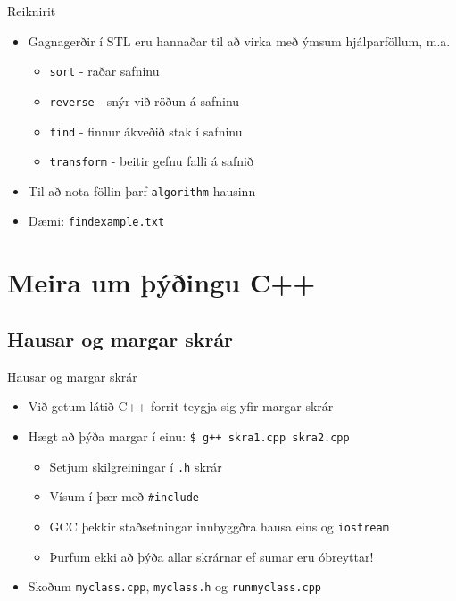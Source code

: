 \documentclass{beamer}
\begin{document}
\begin{frame}{Reiknirit}
	\begin{itemize}
		\item Gagnagerðir í STL eru hannaðar til að virka með ýmsum hjálparföllum, m.a.
		      \begin{itemize}
			      \item \texttt{sort} - raðar safninu
			      \item \texttt{reverse} - snýr við röðun á safninu
			      \item \texttt{find} - finnur ákveðið stak í safninu
			      \item \texttt{transform} - beitir gefnu falli á safnið
		      \end{itemize}
		\item Til að nota föllin þarf \texttt{algorithm} hausinn
		\item Dæmi: \texttt{findexample.txt}
	\end{itemize}
\end{frame}

\section{Meira um þýðingu C++}

\subsection{Hausar og margar skrár}

\begin{frame}{Hausar og margar skrár}
	\begin{itemize}
		\item Við getum látið C++ forrit teygja sig yfir margar skrár
		\item Hægt að þýða margar í einu: \texttt{\$ g++ skra1.cpp skra2.cpp}
		      \begin{itemize}
			      \item Setjum skilgreiningar í \texttt{.h} skrár
			      \item Vísum í þær með \texttt{\#include}
			      \item GCC þekkir staðsetningar innbyggðra hausa eins og \texttt{iostream}
			      \item Þurfum ekki að þýða allar skrárnar ef sumar eru óbreyttar!
		      \end{itemize}
		\item Skoðum \texttt{myclass.cpp}, \texttt{myclass.h} og \texttt{runmyclass.cpp}
	\end{itemize}
\end{frame}
\end{document}
